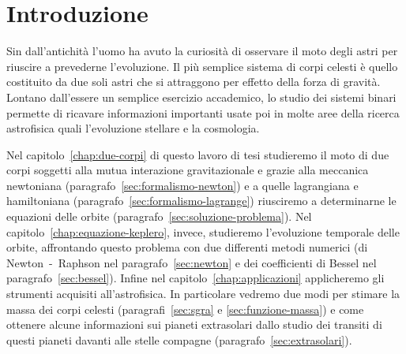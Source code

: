 \cleardoublepage{}
\chapter{Introduzione}
\label{cha:introduzione}

Sin dall'antichità l'uomo ha avuto la curiosità di osservare il moto degli astri
per riuscire a prevederne l'evoluzione. Il più semplice sistema di corpi celesti
è quello costituito da due soli astri che si attraggono per effetto della forza
di gravità. Lontano dall'essere un semplice esercizio accademico, lo studio dei
sistemi binari permette di ricavare informazioni importanti usate poi in molte
aree della ricerca astrofisica quali l'evoluzione stellare e la cosmologia.

Nel capitolo~\ref{chap:due-corpi} di questo lavoro di tesi studieremo il moto di
due corpi soggetti alla mutua interazione gravitazionale e grazie alla meccanica
newtoniana (paragrafo~\ref{sec:formalismo-newton}) e a quelle lagrangiana e
hamiltoniana (paragrafo~\ref{sec:formalismo-lagrange}) riusciremo a determinarne
le equazioni delle orbite (paragrafo~\ref{sec:soluzione-problema}). Nel
capitolo~\ref{chap:equazione-keplero}, invece, studieremo l'evoluzione temporale
delle orbite, affrontando questo problema con due differenti metodi numerici (di
Newton~-~Raphson nel paragrafo~\ref{sec:newton} e dei coefficienti di Bessel nel
paragrafo~\ref{sec:bessel}). Infine nel capitolo~\ref{chap:applicazioni}
applicheremo gli strumenti acquisiti all'astrofisica. In particolare vedremo due
modi per stimare la massa dei corpi celesti (paragrafi~\ref{sec:sgra} e
\ref{sec:funzione-massa}) e come ottenere alcune informazioni sui pianeti
extrasolari dallo studio dei transiti di questi pianeti davanti alle stelle
compagne (paragrafo~\ref{sec:extrasolari}).

